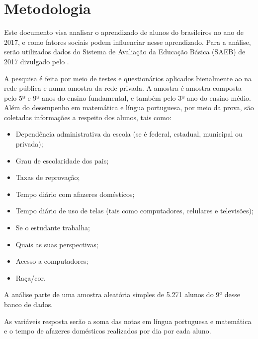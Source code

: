 


\chapter{Metodologia}
Este documento visa analisar o aprendizado de alunos do brasileiros no ano de 2017,
e como fatores sociais podem influenciar nesse aprendizado. Para a análise, serão utilizados dados
do Sistema de Avaliação da Educação Básica (SAEB) de 2017 divulgado pelo .

A pesquisa é feita por meio de testes e questionários aplicados bienalmente ao na rede pública
e numa amostra da rede privada. A amostra é amostra composta pelo 5º e 9º anos do ensino fundamental, e também
pelo 3º ano do ensino médio. Além do desempenho em matemática e língua portuguesa, por meio da prova,
são coletadas informações a respeito dos alunos, tais como:
    
    \begin{itemize}
        \item Dependência administrativa da escola (se é federal, estadual, municipal ou privada);
        \item Grau de escolaridade dos pais; 
        \item Taxas de reprovação;
        \item Tempo diário com afazeres domésticos;
        \item Tempo diário de uso de telas (tais como computadores, celulares e televisões);
        \item Se o estudante trabalha;
        \item Quais as suas perspectivas;
        \item Acesso a computadores;
        \item Raça/cor.
    \end{itemize}


A análise parte de uma amostra aleatória simples de 5.271 alunos do 9º desse banco de dados.

As variáveis resposta serão a soma das notas em língua portuguesa e matemática e o tempo de afazeres domésticos realizados por dia por cada aluno.

